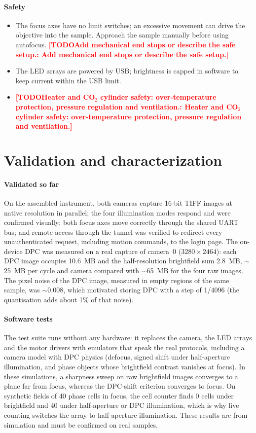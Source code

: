 \documentclass[preprint,12pt]{elsarticle}
\DeclareRobustCommand{\TODO}[1]{\textcolor{red}{\textbf{[TODO\ifx\relax#1\relax\else: #1\fi]}}}
\begin{document}
\paragraph{Safety}
\begin{itemize}
\item The focus axes have no limit switches; an excessive movement can
  drive the objective into the sample. Approach the sample manually before
  using autofocus. \TODO{Add mechanical end stops or describe the safe
  setup.}
\item The LED arrays are powered by USB; brightness is capped in software to
  keep current within the USB limit.
\item \TODO{Heater and CO$_2$ cylinder safety: over-temperature protection,
  pressure regulation and ventilation.}
\end{itemize}

\section{Validation and characterization}

\paragraph{Validated so far} On the assembled instrument, both cameras
capture 16-bit TIFF images at native resolution in parallel; the four
illumination modes respond and were confirmed visually; both focus axes
move correctly through the shared UART bus; and remote access through the
tunnel was verified to redirect every unauthenticated request, including
motion commands, to the login page. The on-device DPC was measured on a
real capture of camera~0 ($3280\times2464$): each DPC image occupies
10.6~MB and the half-resolution brightfield sum 2.8~MB, $\sim$25~MB per
cycle and camera compared with $\sim$65~MB for the four raw images. The
pixel noise of the DPC image, measured in empty regions of the same sample,
was $\sim$0.008, which motivated storing DPC with a step of 1/4096 (the
quantisation adds about 1\% of that noise).

\paragraph{Software tests} The test suite runs without any hardware: it
replaces the camera, the LED arrays and the motor drivers with emulators
that speak the real protocols, including a camera model with DPC physics
(defocus, signed shift under half-aperture illumination, and phase objects
whose brightfield contrast vanishes at focus). In these simulations, a
sharpness sweep on raw brightfield images converges to a plane far from
focus, whereas the DPC-shift criterion converges to focus. On synthetic
fields of 40 phase cells in focus, the cell counter finds 0 cells under
brightfield and 40 under half-aperture or DPC illumination, which is why
live counting switches the array to half-aperture illumination. These
results are from simulation and must be confirmed on real samples.
\end{document}
